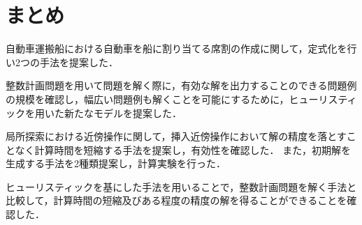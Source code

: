 \chapter{まとめ}\label{conclution}
自動車運搬船における自動車を船に割り当てる席割の作成に関して，定式化を行い2つの手法を提案した．

整数計画問題を用いて問題を解く際に，有効な解を出力することのできる問題例の規模を確認し，幅広い問題例も解くことを可能にするために，ヒューリスティックを用いた新たなモデルを提案した．

局所探索における近傍操作に関して，挿入近傍操作において解の精度を落とすことなく計算時間を短縮する手法を提案し，有効性を確認した．
また，初期解を生成する手法を2種類提案し，計算実験を行った．

ヒューリスティックを基にした手法を用いることで，整数計画問題を解く手法と比較して，計算時間の短縮及びある程度の精度の解を得ることができることを確認した．
